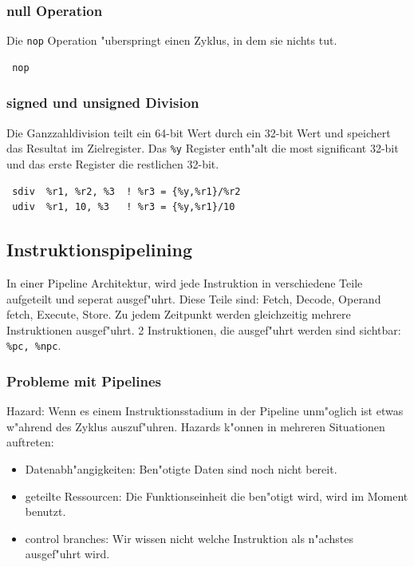 \documentclass[german, 10pt, a4paper, twocolumn]{scrartcl}
\begin{document}
\subsubsection{null Operation}

Die \verb#nop# Operation "uberspringt einen Zyklus, in dem sie nichts tut.

\begin{verbatim}
 nop
\end{verbatim}

\subsubsection{signed und unsigned Division}

Die Ganzzahldivision teilt ein 64-bit Wert durch ein 32-bit Wert und speichert das Resultat im Zielregister. Das \verb#%y# Register enth"alt die most significant 32-bit und das erste Register die restlichen 32-bit.

\begin{verbatim}
 sdiv  %r1, %r2, %3  ! %r3 = {%y,%r1}/%r2
 udiv  %r1, 10, %3   ! %r3 = {%y,%r1}/10
\end{verbatim}

\subsection{Instruktionspipelining}

In einer Pipeline Architektur, wird jede Instruktion in verschiedene Teile aufgeteilt und seperat ausgef"uhrt. Diese Teile sind: Fetch, Decode, Operand fetch, Execute, Store. Zu jedem Zeitpunkt werden gleichzeitig mehrere Instruktionen ausgef"uhrt. 2 Instruktionen, die ausgef"uhrt werden sind sichtbar: \verb#%pc, %npc#.

\subsubsection{Probleme mit Pipelines}

Hazard: Wenn es einem Instruktionsstadium in der Pipeline unm"oglich ist etwas w"ahrend des Zyklus auszuf"uhren. Hazards k"onnen in mehreren Situationen auftreten:
\begin{itemize}
	\item Datenabh"angigkeiten: Ben"otigte Daten sind noch nicht bereit.
	\item geteilte Ressourcen: Die Funktionseinheit die ben"otigt wird, wird im Moment benutzt.
	\item control branches: Wir wissen nicht welche Instruktion als n"achstes ausgef"uhrt wird.
\end{itemize}
\end{document}
